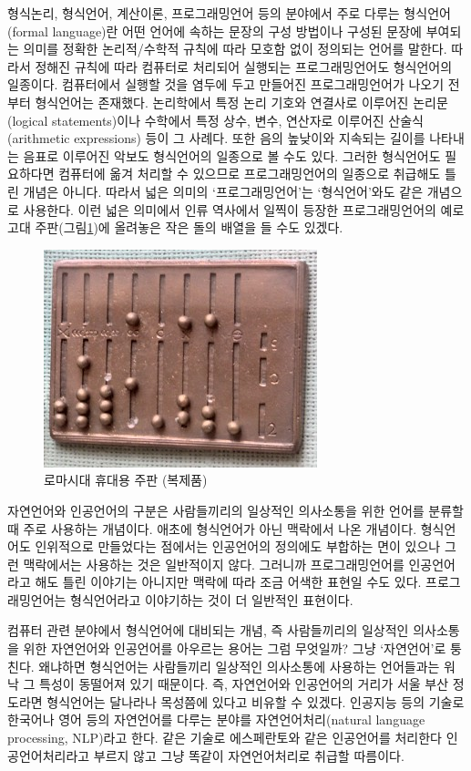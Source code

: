 \documentclass[b5paper,chapter,figtabcapt]{oblivoir}
\begin{document}
형식논리, 형식언어, 계산이론, 프로그래밍언어 등의 분야에서 주로 다루는
형식언어(formal language)란 어떤 언어에 속하는 문장의 구성 방법이나
구성된 문장에 부여되는 의미를 정확한 논리적/수학적 규칙에 따라 모호함 없이
정의되는 언어를 말한다. 따라서 정해진 규칙에 따라 컴퓨터로 처리되어 실행되는
프로그래밍언어도 형식언어의 일종이다. 컴퓨터에서 실행할 것을 염두에 두고
만들어진 프로그래밍언어가 나오기 전부터 형식언어는 존재했다.
논리학에서 특정 논리 기호와 연결사로 이루어진 논리문(logical statements)이나
수학에서 특정 상수, 변수, 연산자로 이루어진 산술식(arithmetic expressions)
등이 그 사례다. 또한 음의 높낮이와 지속되는 길이를 나타내는 음표로 이루어진
악보도 형식언어의 일종으로 볼 수도 있다. 그러한 형식언어도 필요하다면
컴퓨터에 옮겨 처리할 수 있으므로 프로그래밍언어의 일종으로 취급해도
틀린 개념은 아니다. 따라서 넓은 의미의 `프로그래밍언어'는 `형식언어'와도
같은 개념으로 사용한다. 이런 넓은 의미에서 인류 역사에서 일찍이 등장한
프로그래밍언어의 예로 고대 주판(그림\;\ref{fig:RomanAbacus})에 올려놓은
작은 돌의 배열을 들 수도 있겠다.

\begin{figure}[b]\center
\includegraphics[scale=0.5]{imgs/RomanAbacusRecon.jpg}
\caption{로마시대 휴대용 주판 (복제품)\label{fig:RomanAbacus}\\
          }
\end{figure}

자연언어와 인공언어의 구분은 사람들끼리의 일상적인 의사소통을 위한 언어를
분류할 때 주로 사용하는 개념이다. 애초에 형식언어가 아닌 맥락에서 나온 개념이다.
형식언어도 인위적으로 만들었다는 점에서는 인공언어의 정의에도 부합하는 면이 있으나
그런 맥락에서는 사용하는 것은 일반적이지 않다. 그러니까 프로그래밍언어를
인공언어라고 해도 틀린 이야기는 아니지만 맥락에 따라 조금 어색한 표현일 수도 있다.
프로그래밍언어는 형식언어라고 이야기하는 것이 더 일반적인 표현이다.

컴퓨터 관련 분야에서 형식언어에 대비되는 개념, 즉 사람들끼리의 일상적인
의사소통을 위한 자연언어와 인공언어를 아우르는 용어는 그럼 무엇일까?
그냥 `자연언어'로 퉁친다. 왜냐하면 형식언어는 사람들끼리 일상적인
의사소통에 사용하는 언어들과는 워낙 그 특성이 동떨어져 있기 때문이다.
즉, 자연언어와 인공언어의 거리가 서울 부산 정도라면 형식언어는 달나라나
목성쯤에 있다고 비유할 수 있겠다. 인공지능 등의 기술로 한국어나 영어 등의
자연언어를 다루는 분야를 자연언어처리(natural language processing, NLP)라고 한다.
같은 기술로 에스페란토와 같은 인공언어를 처리한다 인공언어처리라고 부르지 않고
그냥 똑같이 자연언어처리로 취급할 따름이다.
\end{document}
